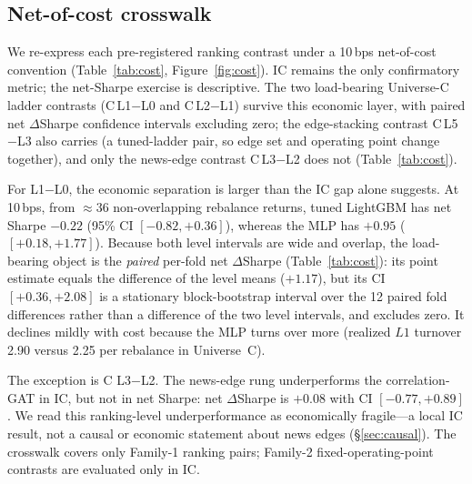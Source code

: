 \documentclass[sigconf,nonacm]{acmart}
\begin{document}
\subsection{Net-of-cost crosswalk}\label{sec:cost}
We re-express each pre-registered ranking contrast under a 10\,bps net-of-cost convention (Table~\ref{tab:cost}, Figure~\ref{fig:cost}). IC remains the only confirmatory metric; the net-Sharpe exercise is descriptive. The two load-bearing Universe-C ladder contrasts (C\,L1$-$L0 and C\,L2$-$L1) survive this economic layer, with paired net $\Delta$Sharpe confidence intervals excluding zero; the edge-stacking contrast C\,L5$-$L3 also carries (a tuned-ladder pair, so edge set and operating point change together), and only the news-edge contrast C\,L3$-$L2 does not (Table~\ref{tab:cost}).

For L1$-$L0, the economic separation is larger than the IC gap alone suggests. At 10\,bps, from ${\approx}36$ non-overlapping rebalance returns, tuned LightGBM has net Sharpe $-0.22$ (95\% CI $[-0.82,+0.36]$), whereas the MLP has $+0.95$ ($[+0.18,+1.77]$). Because both level intervals are wide and overlap, the load-bearing object is the \emph{paired} per-fold net $\Delta$Sharpe (Table~\ref{tab:cost}): its point estimate equals the difference of the level means ($+1.17$), but its CI $[+0.36,+2.08]$ is a stationary block-bootstrap interval over the 12 paired fold differences rather than a difference of the two level intervals, and excludes zero. It declines mildly with cost because the MLP turns over more (realized $L1$ turnover 2.90 versus 2.25 per rebalance in Universe~C).

The exception is C L3$-$L2. The news-edge rung underperforms the correlation-GAT in IC, but not in net Sharpe: net $\Delta$Sharpe is $+0.08$ with CI $[-0.77,+0.89]$. We read this ranking-level underperformance as economically fragile---a local IC result, not a causal or economic statement about news edges (\S\ref{sec:causal}). The crosswalk covers only Family-1 ranking pairs; Family-2 fixed-operating-point contrasts are evaluated only in IC.
\end{document}
